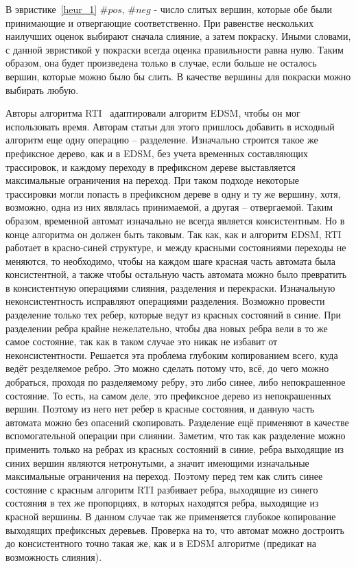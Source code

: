 \documentclass[times,specification,annotation]{itmo-student-thesis}
\begin{document}
В эвристике~\ref{heur_1} $\#pos$, $\#neg$ - число слитых вершин, которые обе были принимающие и отвергающие соответственно. При равенстве нескольких наилучших оценок выбирают сначала
слияние, а затем покраску. Иными словами, с данной эвристикой у покраски всегда оценка правильности равна нулю. Таким образом, она будет произведена только в случае, 
если больше не осталось вершин, которые можно было бы слить. В качестве вершины для покраски можно выбирать любую.

Авторы алгоритма RTI~\cite{rti} адаптировали алгоритм EDSM, чтобы он мог использовать время. Авторам статьи для этого пришлось добавить в исходный алгоритм еще одну операцию -- разделение.
Изначально строится такое же префиксное дерево, как и в EDSM, без учета временных составляющих трассировок, и каждому переходу в префиксном дереве выставляется максимальные ограничения на переход.
При таком подходе некоторые трассировки могли попасть в префиксном дереве в одну и ту же вершину, хотя, возможно, одна из них являлась принимаемой, а другая -- отвергаемой. Таким образом, временной
автомат изначально не всегда является консистентным. Но в конце алгоритма он должен быть таковым. Так как, как и алгоритм EDSM, RTI работает в красно-синей структуре, и между красными состояниями
переходы не меняются, то необходимо, чтобы на каждом шаге красная часть автомата была консистентной, а также чтобы остальную часть автомата можно было превратить в консистентную
операциями слияния, разделения и перекраски. Изначальную неконсистентность исправляют операциями разделения. Возможно провести разделение только тех ребер, которые ведут из красных состояний в синие. 
При разделении ребра крайне нежелательно, чтобы два новых ребра вели в то же самое состояние, так как в таком случае это никак не избавит от неконсистентности.
Решается эта проблема глубоким копированием всего, куда ведёт резделяемое ребро. Это можно сделать потому что, всё, до чего можно добраться, проходя по разделяемому ребру, это либо синее, либо
непокрашенное состояние. То есть, на самом деле, это префиксное дерево из непокрашенных вершин. Поэтому из него нет ребер в красные состояния, и данную часть автомата можно без опасений скопировать.
Разделение ещё применяют в качестве вспомогательной операции при слиянии. Заметим, что так как разделение можно применить только на ребрах из красных состояний в синие, ребра выходящие из синих
вершин являются нетронутыми, а значит имеющими изначальные максимальные ограничения на переход. Поэтому перед тем как слить синее состояние с красным алгоритм RTI разбивает ребра, 
выходящие из синего состояния в тех же пропорциях, в которых находятся ребра, выходящие из красной вершины. В данном случае так же применяется глубокое копирование выходящих префиксных деревьев.
Проверка на то, что автомат можно достроить до консистентного точно такая же, как и в EDSM алгоритме (предикат на возможность слияния).
\end{document}
